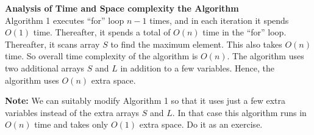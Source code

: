 \documentclass[11pt]{article}
\begin{document}
\noindent
{\bf Analysis of Time and Space complexity the Algorithm}\\

Algorithm 1 executes ``for'' loop $n-1$ times, and in each iteration it spends
$O(1)$ time. Thereafter, it spends a total of $O(n)$ time in the ``for'' loop.
Thereafter, it scans array $S$ to find the maximum element. This also takes
$O(n)$ time. So overall time complexity of the algorithm is $O(n)$.
The algorithm uses two additional arrays $S$ and $L$ in addition to
a few variables. Hence, the algorithm uses $O(n)$ extra space.

\textbf{Note:} We can suitably modify  Algorithm 1 so that it uses just
a few extra variables instead of the extra arrays $S$ and $L$.
In that case this algorithm runs in $O(n)$ time and takes only $O(1)$ extra
space. Do it as an exercise.\\
\end{document}
